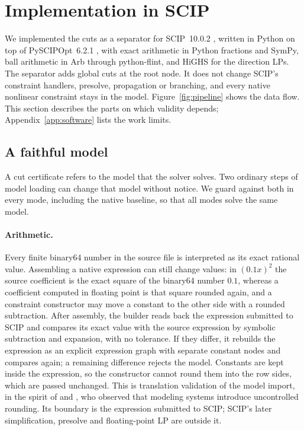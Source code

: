 \section{Implementation in SCIP}\label{sec:implementation}

We implemented the cuts as a separator for SCIP~10.0.2 \citep{SCIP10},
written in Python on top of PySCIPOpt~6.2.1 \citep{PySCIPOpt}, with exact
arithmetic in Python fractions and SymPy, ball arithmetic in Arb through
python-flint, and HiGHS for the direction LPs. The separator adds global
cuts at the root node. It does not change SCIP's constraint handlers,
presolve, propagation or branching, and every native nonlinear
constraint stays in the model. Figure~\ref{fig:pipeline} shows the data flow. This section describes the parts on which
validity depends; Appendix~\ref{app:software} lists the work limits.



\subsection{A faithful model}\label{sec:faithful}

A cut certificate refers to the model that the solver solves. Two
ordinary steps of model loading can change that model without notice. We
guard against both in every mode, including the native baseline, so that
all modes solve the same model.

\paragraph{Arithmetic.}
Every finite binary64 number in the source file is interpreted as its
exact rational value. Assembling a native expression can still change
values: in $(0.1x)^2$ the source coefficient is the exact square of the
binary64 number $0.1$, whereas a coefficient computed in floating point is
that square rounded again, and a constraint constructor may move a
constant to the other side with a rounded subtraction. After assembly,
the builder reads back the expression submitted to SCIP and compares its
exact value with the source expression by symbolic subtraction and
expansion, with no tolerance. If they differ, it rebuilds the expression
as an explicit expression graph with separate constant nodes and compares
again; a remaining difference rejects the model. Constants are kept inside
the expression, so the constructor cannot round them into the row sides,
which are passed unchanged. This is translation validation
\citep{PnueliSiegelSingerman1998,Necula2000} of the model import, in the
spirit of \citet[Section~20]{Neumaier2004} and \citet{SchichlNeumaier2005},
who observed that modeling systems introduce uncontrolled rounding. Its
boundary is the expression submitted to SCIP; SCIP's later
simplification, presolve and floating-point LP are outside it.

